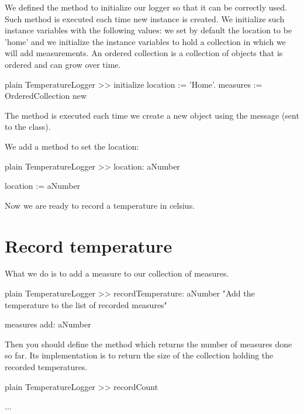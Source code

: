 \documentclass[10pt,twoside,english]{_support/latex/sbabook/sbabook}
\begin{document}
We defined the method  to initialize our logger so that it can be correctly used. Such  method is executed each time new instance is created.
We initialize such instance variables with the following values: we set by default the location to be 'home' and we initialize the  instance variables to hold a collection in which we will add measurements. An ordered collection is a collection of objects that is ordered and can grow over time.

\begin{displaycode}{plain}
TemperatureLogger >> initialize
    location := 'Home'.
    measures := OrderedCollection new
\end{displaycode}

\begin{note}
The method  is executed each time we create a new object using the message  (sent to the class).
\end{note}

We add a method to set the location:

\begin{displaycode}{plain}
TemperatureLogger >> location: aNumber

    location := aNumber
\end{displaycode}

Now we are ready to record a temperature in celsius.
\section{Record temperature}
What we do is to add a measure to our collection of measures.

\begin{displaycode}{plain}
TemperatureLogger >> recordTemperature: aNumber
    "Add the temperature to the list of recorded measures"

    measures add: aNumber
\end{displaycode}

Then you should define the method  which returns the number of measures done so far. Its implementation is to return the size of the collection holding the recorded temperatures.

\begin{displaycode}{plain}
TemperatureLogger >> recordCount

    ...
\end{displaycode}
\end{document}
